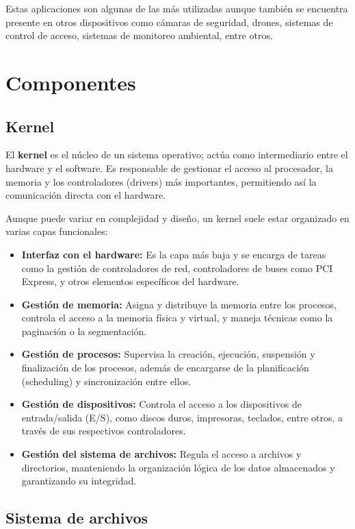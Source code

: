\documentclass[12pt, letterpaper]{article}
\begin{document}
	Estas aplicaciones son algunas de las más utilizadas aunque también se encuentra presente en otros dispositivos como cámaras de seguridad, drones, sistemas de control de acceso, sistemas de monitoreo ambiental, entre otros.

	\section{Componentes}

	\subsection{Kernel}

	El \textbf{kernel} es el núcleo de un sistema operativo; actúa como intermediario entre el hardware y el software. Es responsable de gestionar el acceso al procesador, la memoria y los controladores (drivers) más importantes, permitiendo así la comunicación directa con el hardware.

	Aunque puede variar en complejidad y diseño, un kernel suele estar organizado en varias capas funcionales:

	\begin{itemize}
		\item \textbf{Interfaz con el hardware:} Es la capa más baja y se encarga de tareas como la gestión de controladores de red, controladores de buses como PCI Express, y otros elementos específicos del hardware.
		\item \textbf{Gestión de memoria:} Asigna y distribuye la memoria entre los procesos, controla el acceso a la memoria física y virtual, y maneja técnicas como la paginación o la segmentación.
		\item \textbf{Gestión de procesos:} Supervisa la creación, ejecución, suspensión y finalización de los procesos, además de encargarse de la planificación (scheduling) y sincronización entre ellos.
		\item \textbf{Gestión de dispositivos:} Controla el acceso a los dispositivos de entrada/salida (E/S), como discos duros, impresoras, teclados, entre otros, a través de sus respectivos controladores.
		\item \textbf{Gestión del sistema de archivos:} Regula el acceso a archivos y directorios, manteniendo la organización lógica de los datos almacenados y garantizando su integridad.
	\end{itemize}

	\subsection{Sistema de archivos}
\end{document}
